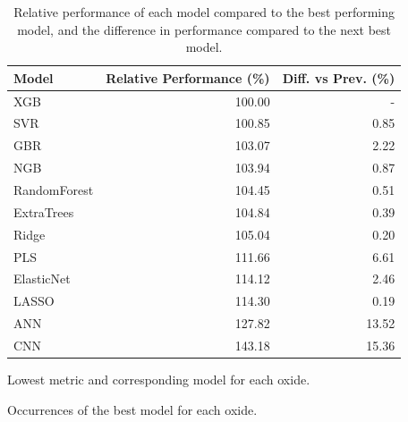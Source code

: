 \begin{table}[ht]
\begin{tabular}{lrr}
\toprule
Model & Relative Performance (\%) & Diff. vs Prev. (\%) \\
\midrule
XGB & 100.00 & - \\
SVR & 100.85 & 0.85 \\
GBR & 103.07 & 2.22 \\
NGB & 103.94 & 0.87 \\
RandomForest & 104.45 & 0.51 \\
ExtraTrees & 104.84 & 0.39 \\
Ridge & 105.04 & 0.20 \\
PLS & 111.66 & 6.61 \\
ElasticNet & 114.12 & 2.46 \\
LASSO & 114.30 & 0.19 \\
ANN & 127.82 & 13.52 \\
CNN & 143.18 & 15.36 \\
\bottomrule
\end{tabular}
\caption{Relative performance of each model compared to the best performing model, and the difference in performance compared to the next best model.}
\label{tab:relative_performance}
\end{table}



\begin{table}[h]
\centering
\begin{minipage}{.7\textwidth}
  \centering
  
  \caption{Lowest metric and corresponding model for each oxide.}
  \label{tab:best_results}
\end{minipage}%
\hspace{0.03\textwidth}
\begin{minipage}{.25\textwidth}
  \centering
  
  \caption{Occurrences of the best model for each oxide.}
  \label{tab:best_model_occurrences}
\end{minipage}
\end{table}
